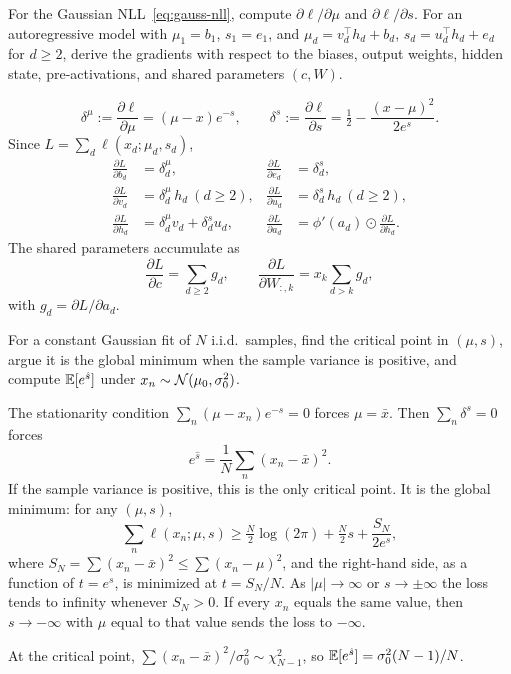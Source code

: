 \begin{hwqbox}
For the Gaussian NLL~\eqref{eq:gauss-nll}, compute $\partial\ell/\partial\mu$ and $\partial\ell/\partial s$. For an autoregressive model with $\mu_1=b_1$, $s_1=e_1$, and $\mu_d=v_d^\top h_d+b_d$, $s_d=u_d^\top h_d+e_d$ for $d\ge 2$, derive the gradients with respect to the biases, output weights, hidden state, pre-activations, and shared parameters $(c,W)$.
\end{hwqbox}
\begin{hwsolbox}
\[
\delta^\mu:=\frac{\partial\ell}{\partial\mu}=(\mu-x)e^{-s},\qquad
\delta^s:=\frac{\partial\ell}{\partial s}=\tfrac12-\frac{(x-\mu)^2}{2e^s}.
\]
Since $L=\sum_d\ell(x_d;\mu_d,s_d)$,
\begin{align*}
\frac{\partial L}{\partial b_d}&=\delta^\mu_d, &
\frac{\partial L}{\partial e_d}&=\delta^s_d,\\
\frac{\partial L}{\partial v_d}&=\delta^\mu_d\,h_d\ (d\ge 2), &
\frac{\partial L}{\partial u_d}&=\delta^s_d\,h_d\ (d\ge 2),\\
\frac{\partial L}{\partial h_d}&=\delta^\mu_d v_d+\delta^s_d u_d, &
\frac{\partial L}{\partial a_d}&=\phi'(a_d)\odot\frac{\partial L}{\partial h_d}.
\end{align*}
The shared parameters accumulate as
\[
\frac{\partial L}{\partial c}=\sum_{d\ge 2}g_d,\qquad
\frac{\partial L}{\partial W_{:,k}}=x_k\sum_{d>k}g_d,
\]
with $g_d=\partial L/\partial a_d$.
\end{hwsolbox}

\begin{hwqbox}
For a constant Gaussian fit of $N$ i.i.d.\ samples, find the critical point in $(\mu,s)$, argue it is the global minimum when the sample variance is positive, and compute $\mathbb{E}[e^{\hat s}]$ under $x_n\sim\mathcal{N}(\mu_0,\sigma_0^2)$.
\end{hwqbox}
\begin{hwsolbox}
The stationarity condition $\sum_n(\mu-x_n)e^{-s}=0$ forces $\mu=\bar x$. Then $\sum_n\delta^s=0$ forces
\[
e^{\hat s}=\frac1N\sum_n(x_n-\bar x)^2.
\]
If the sample variance is positive, this is the only critical point. It is the global minimum: for any $(\mu,s)$,
\[
\sum_n\ell(x_n;\mu,s)\ge \tfrac N2\log(2\pi)+\tfrac N2 s+\frac{S_N}{2e^s},
\]
where $S_N=\sum(x_n-\bar x)^2\le\sum(x_n-\mu)^2$, and the right-hand side, as a function of $t=e^s$, is minimized at $t=S_N/N$. As $|\mu|\to\infty$ or $s\to\pm\infty$ the loss tends to infinity whenever $S_N>0$. If every $x_n$ equals the same value, then $s\to-\infty$ with $\mu$ equal to that value sends the loss to $-\infty$.

At the critical point, $\sum(x_n-\bar x)^2/\sigma_0^2\sim\chi^2_{N-1}$, so $\mathbb{E}[e^{\hat s}]=\sigma_0^2(N-1)/N$.
\end{hwsolbox}

